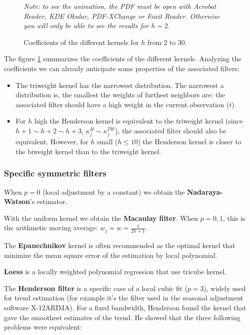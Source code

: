 \documentclass[
  12pt,
  ,
  a4paper]{article}
\newcommand\1{\mathds{1}}
\begin{document}
\begin{figure}[!ht]
\caption{Coefficients of the different kernels for $h$ from 2 to 30.}\label{fig:kernels}\footnotesize
\emph{Note: to see the animation, the PDF must be open with Acrobat Reader, KDE Okular, PDF-XChange or Foxit Reader. 
Otherwise you will only be able to see the results for $h=2$.}
\end{figure}

The figure \ref{fig:kernels} summarizes the coefficients of the different kernels.
Analyzing the coefficients we can already anticipate some properties of the associated filters:

\begin{itemize}
\item
  The triweight kernel has the narrowest distribution.
  The narrowest a distribution is, the smallest the weights of furthest neighbors are: the associated filter should have a high weight in the current observation (\(t\)).
\item
  For \(h\) high the Henderson kernel is equivalent to the triweight kernel (since \(h+1\sim h+2 \sim h+3\), \(\kappa_j^H\sim\kappa_j^{TW}\)), the associated filter should also be equivalent.
  However, for \(h\) small (\(h\leq10\)) the Henderson kernel is closer to the biweight kernel than to the triweight kernel.
\end{itemize}

\hypertarget{sec:sympolyfilter}{%
\subsubsection{Specific symmetric filters}\label{sec:sympolyfilter}}

When \(p=0\) (local adjustment by a constant) we obtain the \textbf{Nadaraya-Watson}'s estimator.

With the uniform kernel we obtain the \textbf{Macaulay filter}.
When \(p=0,1\), this is the arithmetic moving average: \(w_j=w=\frac{1}{2h+1}\).

The \textbf{Epanechnikov} kernel is often recommended as the optimal kernel that minimize the mean square error of the estimation by local polynomial.

\textbf{Loess} is a locally weighted polynomial regression that use tricube kernel.

The \textbf{Henderson filter} is a specific case of a local cubic fit (\(p=3\)), widely used for trend estimation (for example it's the filter used in the seasonal adjustment software X-12ARIMA). For a fixed bandwidth, Henderson found the kernel that gave the smoothest estimates of the trend.
He showed that the three following problems were equivalent:
\end{document}
